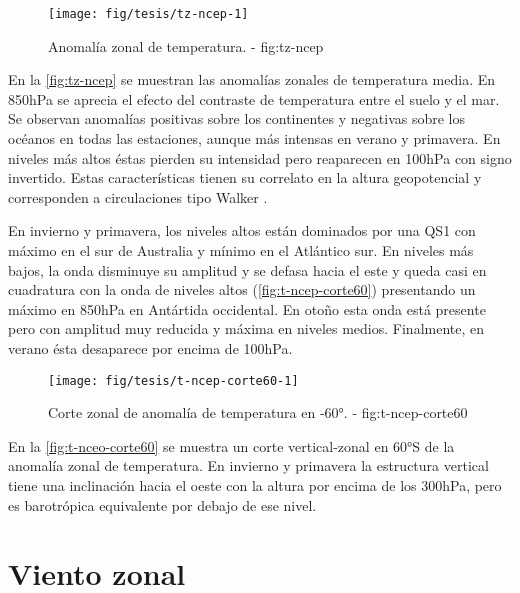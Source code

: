 \documentclass[spanish,a4paper]{book}
\begin{document}
\begin{landscape}\begin{figure}

{\centering \texttt{[image: fig/tesis/tz-ncep-1]} 

}

\caption{Anomalía zonal de temperatura. - fig:tz-ncep}\label{fig:tz-ncep}
\end{figure}
\end{landscape}

En la \autoref{fig:tz-ncep} se muestran las anomalías zonales de
temperatura media. En 850hPa se aprecia el efecto del contraste de
temperatura entre el suelo y el mar. Se observan anomalías positivas
sobre los continentes y negativas sobre los océanos en todas las
estaciones, aunque más intensas en verano y primavera. En niveles más
altos éstas pierden su intensidad pero reaparecen en 100hPa con signo
invertido. Estas características tienen su correlato en la altura
geopotencial y corresponden a circulaciones tipo Walker .

En invierno y primavera, los niveles altos están dominados por una QS1
con máximo en el sur de Australia y mínimo en el Atlántico sur. En
niveles más bajos, la onda disminuye su amplitud y se defasa hacia el
este y queda casi en cuadratura con la onda de niveles altos
(\autoref{fig:t-ncep-corte60}) presentando un máximo en 850hPa en
Antártida occidental. En otoño esta onda está presente pero con amplitud
muy reducida y máxima en niveles medios. Finalmente, en verano ésta
desaparece por encima de 100hPa.

\begin{figure}

{\centering \texttt{[image: fig/tesis/t-ncep-corte60-1]} 

}

\caption{Corte zonal de anomalía de temperatura en -60°. - fig:t-ncep-corte60}\label{fig:t-ncep-corte60}
\end{figure}

En la \autoref{fig:t-nceo-corte60} se muestra un corte vertical-zonal en
60°S de la anomalía zonal de temperatura. En invierno y primavera la
estructura vertical tiene una inclinación hacia el oeste con la altura
por encima de los 300hPa, pero es barotrópica equivalente por debajo de
ese nivel.

\section{Viento zonal}\label{viento-zonal}
\end{document}
